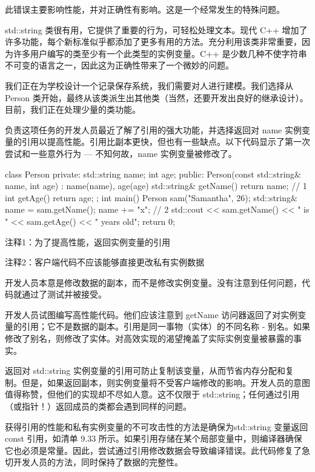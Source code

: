 此错误主要影响性能，并对正确性有影响。这是一个经常发生的特殊问题。

std::string 类很有用，它提供了重要的行为，可轻松处理文本。现代 C++ 增加了许多功能，每个新标准似乎都添加了更多有用的方法。充分利用该类非常重要，因为许多用户编写的类至少有一个此类型的实例变量。C++ 是少数几种不使字符串不可变的语言之一，因此这为正确性带来了一个微妙的问题。


我们正在为学校设计一个记录保存系统，我们需要对人进行建模。我们选择从 Person 类开始，最终从该类派生出其他类（当然，还要开发出良好的继承设计）。目前，我们正在处理少量的类功能。

负责这项任务的开发人员最近了解了引用的强大功能，并选择返回对 name 实例变量的引用以提高性能。引用比副本更快，但也有一些缺点。以下代码显示了第一次尝试和一些意外行为 — 不知何故，name 实例变量被修改了。


\begin{cpp}
class Person {
private:
  std::string name;
  int age;
public:
  Person(const std::string& name, int age) : name(name), age(age) {}
  std::string& getName() { return name; } // 1
  int getAge() { return age; }
};
int main() {
  Person sam("Samantha", 26);
  std::string& name = sam.getName();
  name += "x"; // 2
  std::cout << sam.getName() << " is " << sam.getAge() << " years old\n";
  return 0;
}
\end{cpp}

{\footnotesize
注释1：为了提高性能，返回实例变量的引用

注释2：客户端代码不应该能够直接更改私有实例数据
}

开发人员本意是修改数据的副本，而不是修改实例变量。没有注意到任何问题，代码就通过了测试并被接受。


开发人员试图编写高性能代码。他们应该注意到 getName 访问器返回了对实例变量的引用；它不是数据的副本。引用是同一事物（实体）的不同名称 - 别名。如果修改了别名，则修改了实体。对高效实现的渴望掩盖了实际实例变量被暴露的事实。


返回对 std::string 实例变量的引用可防止复制该变量，从而节省内存分配和复制。但是，如果返回副本，则实例变量将不受客户端修改的影响。开发人员的意图值得称赞，但他们的实现却不尽如人意。这不仅限于 std::string；任何通过引用（或指针！）返回成员的类都会遇到同样的问题。

获得引用的性能和私有实例变量的不可攻击性的方法是确保为std::string 变量返回 const 引用，如清单 9.33 所示。如果引用存储在某个局部变量中，则编译器确保它也必须是常量。因此，尝试通过引用修改数据会导致编译错误。此代码修复了急切开发人员的方法，同时保持了数据的完整性。

